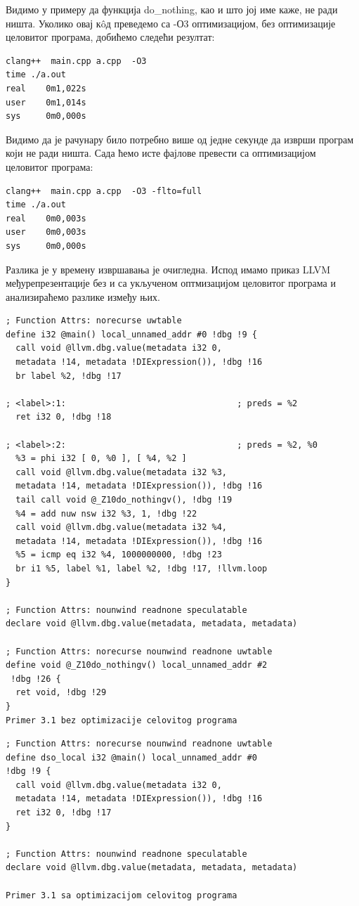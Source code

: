 \documentclass[12pt,oneside]{memoir}
\begin{document}
Видимо у примеру да функција  do{\_}nothing, као и што јој име каже, не ради ништа.
Уколико овај к\^{o}д преведемо са -О3 оптимизацијом, без оптимизације целовитог програма, добићемо следећи резултат:

\begin{lstlisting}[frame=single]
clang++  main.cpp a.cpp  -O3
time ./a.out 
real    0m1,022s
user    0m1,014s
sys     0m0,000s
\end{lstlisting}
Видимо да је рачунару било потребно више од једне секунде да изврши програм који не ради ништа.
Сада ћемо исте фајлове превести са оптимизацијом целовитог програма:
\begin{lstlisting}[frame=single]
clang++  main.cpp a.cpp  -O3 -flto=full
time ./a.out 
real    0m0,003s
user    0m0,003s
sys     0m0,000s
\end{lstlisting}

Разлика је у времену извршавања је очигледна.
Испод имамо приказ LLVM међурепрезентације без и са укљученом оптмизацијом целовитог програма
и анализираћемо разлике између њих.
\begin{lstlisting}[frame=single]
; Function Attrs: norecurse uwtable
define i32 @main() local_unnamed_addr #0 !dbg !9 {
  call void @llvm.dbg.value(metadata i32 0, 
  metadata !14, metadata !DIExpression()), !dbg !16
  br label %2, !dbg !17

; <label>:1:                                  ; preds = %2
  ret i32 0, !dbg !18

; <label>:2:                                  ; preds = %2, %0
  %3 = phi i32 [ 0, %0 ], [ %4, %2 ]
  call void @llvm.dbg.value(metadata i32 %3, 
  metadata !14, metadata !DIExpression()), !dbg !16
  tail call void @_Z10do_nothingv(), !dbg !19
  %4 = add nuw nsw i32 %3, 1, !dbg !22
  call void @llvm.dbg.value(metadata i32 %4,
  metadata !14, metadata !DIExpression()), !dbg !16
  %5 = icmp eq i32 %4, 1000000000, !dbg !23
  br i1 %5, label %1, label %2, !dbg !17, !llvm.loop
}

; Function Attrs: nounwind readnone speculatable
declare void @llvm.dbg.value(metadata, metadata, metadata)

; Function Attrs: norecurse nounwind readnone uwtable
define void @_Z10do_nothingv() local_unnamed_addr #2 
 !dbg !26 {
  ret void, !dbg !29
}
Primer 3.1 bez optimizacije celovitog programa
\end{lstlisting}


\begin{lstlisting}[frame=single]
; Function Attrs: norecurse nounwind readnone uwtable
define dso_local i32 @main() local_unnamed_addr #0 
!dbg !9 {
  call void @llvm.dbg.value(metadata i32 0, 
  metadata !14, metadata !DIExpression()), !dbg !16
  ret i32 0, !dbg !17
}

; Function Attrs: nounwind readnone speculatable
declare void @llvm.dbg.value(metadata, metadata, metadata)

Primer 3.1 sa optimizacijom celovitog programa
\end{lstlisting}
\end{document}
